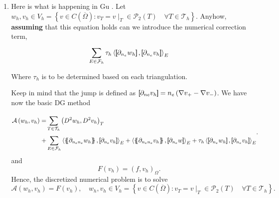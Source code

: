 \begin{enumerate}[label=(\alph*)]
    \item Here is what is happening in Gu \cite{gu2012c0}. Let $w_{h}, v_{h} \in V_{h} = \left\{ v \in C\left(
        \overline{\Omega }  \right): v_{T } = v \mid _{T} \in  \mathcal{P}   _{2} \left( T \right) \quad  \forall T \in
    \mathcal{T}_{h} \right\} $.
Anyhow, \textbf{assuming} that this equation holds can we introduce the numerical correction term,  \[
\sum_{E \in  \mathcal{F} _{h}}^{}  \tau _{h} \left< \jump{ \partial _{n_{e}} w_{h}}, \jump{     \partial _{n_{e}} v_{h}
}   \right>_{E}
\]


Where $\tau _{h}$ is to be determined based on each triangulation.

Keep in mind that the jump is defined as $\left[\!\!\left[  \partial _{ne} v _{h}  \right]\!\!\right] = n_{e} \left( \nabla v_{+} - \nabla v_{-}
\right)   $. We have now the basic DG method

\begin{equation}
\label{eq:basic_dg_A_h}
\begin{split}
\mathcal{A} \left( w_{h}, v_{h} \right)   =&  \sum_{T \in \mathcal{T} _{h}}^{} \left( D^2 w_{h}, D^2v_{h} \right) _{T} \\ +
 & \sum_{E \in \mathcal{F}_{h} }^{} \left<\mean{  \partial _{n_{e} n_{e}} w_{h} }, \jump{ \partial _{n_{e}} v_{h}}
\right>_{E}  + \left< \mean{ \partial _{n_{e} n_{e}} v_{h} }, \jump{ \partial _{n_{e}}w }      \right>_{E}
+
\tau _{h} \left< \jump{ \partial _{n_{e}} w_{h}}, \jump{     \partial _{n_{e}} v_{h}   }   \right>_{E}
\end{split}
.\end{equation}
and
\begin{equation}
\label{eq:basic_dg_F_h}
F\left( v_{h} \right)  = \left( f, v_{h} \right) _{\Omega }
.\end{equation}
Hence, the discretized numerical problem is to solve \[
\mathcal{A}\left( w_{h}, v_{h} \right)   = F\left( v_{h} \right), \quad w_{h},v_{h} \in V_{h}  = \left\{ v \in C\left(
        \overline{\Omega }  \right): v_{T } = v \mid _{T} \in  \mathcal{P}   _{2} \left( T \right) \quad  \forall T \in
    \mathcal{T}_{h} \right\} .
\]



\end{enumerate}
